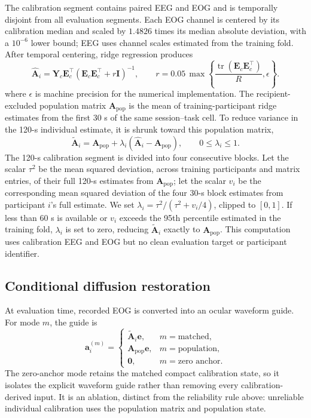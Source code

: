 The calibration segment contains paired EEG and EOG and is temporally disjoint from all evaluation segments. Each EOG channel is centered by its calibration median and scaled by $1.4826$ times its median absolute deviation, with a $10^{-6}$ lower bound; EEG uses channel scales estimated from the training fold. After temporal centering, ridge regression produces
\begin{equation}
  \widehat{\mathbf{A}}_i=\mathbf{Y}_c\mathbf{E}_c^\top
  \left(\mathbf{E}_c\mathbf{E}_c^\top+r\mathbf{I}\right)^{-1},
  \qquad
  r=0.05\,\max\!\left\{
  \frac{\operatorname{tr}(\mathbf{E}_c\mathbf{E}_c^\top)}{R},\epsilon\right\}.
  \label{eq:ridge}
\end{equation}
where $\epsilon$ is machine precision for the numerical implementation.
The recipient-excluded population matrix $\mathbf{A}_{\mathrm{pop}}$ is the mean of training-participant ridge estimates from the first 30 s of the same session--task cell. To reduce variance in the 120-s individual estimate, it is shrunk toward this population matrix,
\begin{equation}
  \widetilde{\mathbf{A}}_i=
  \mathbf{A}_{\mathrm{pop}}+\lambda_i
  (\widehat{\mathbf{A}}_i-\mathbf{A}_{\mathrm{pop}}),
  \qquad 0\leq\lambda_i\leq1.
  \label{eq:shrinkage}
\end{equation}
The 120-s calibration segment is divided into four consecutive blocks. Let the scalar $\tau^2$ be the mean squared deviation, across training participants and matrix entries, of their full 120-s estimates from $\mathbf{A}_{\mathrm{pop}}$; let the scalar $v_i$ be the corresponding mean squared deviation of the four 30-s block estimates from participant $i$'s full estimate. We set $\lambda_i=\tau^2/(\tau^2+v_i/4)$, clipped to $[0,1]$. If less than 60 s is available or $v_i$ exceeds the 95th percentile estimated in the training fold, $\lambda_i$ is set to zero, reducing $\widetilde{\mathbf{A}}_i$ exactly to $\mathbf{A}_{\mathrm{pop}}$. This computation uses calibration EEG and EOG but no clean evaluation target or participant identifier.

\subsection{Conditional diffusion restoration}

At evaluation time, recorded EOG is converted into an ocular waveform guide. For mode $m$, the guide is
\begin{equation}
  \mathbf{a}^{(m)}_i=
  \begin{cases}
    \widetilde{\mathbf{A}}_i\mathbf{e}, & m=\text{matched},\\
    \mathbf{A}_{\mathrm{pop}}\mathbf{e}, & m=\text{population},\\
    \mathbf{0}, & m=\text{zero anchor}.
  \end{cases}
  \label{eq:guide-modes}
\end{equation}
The zero-anchor mode retains the matched compact calibration state, so it isolates the explicit waveform guide rather than removing every calibration-derived input. It is an ablation, distinct from the reliability rule above: unreliable individual calibration uses the population matrix and population state.

